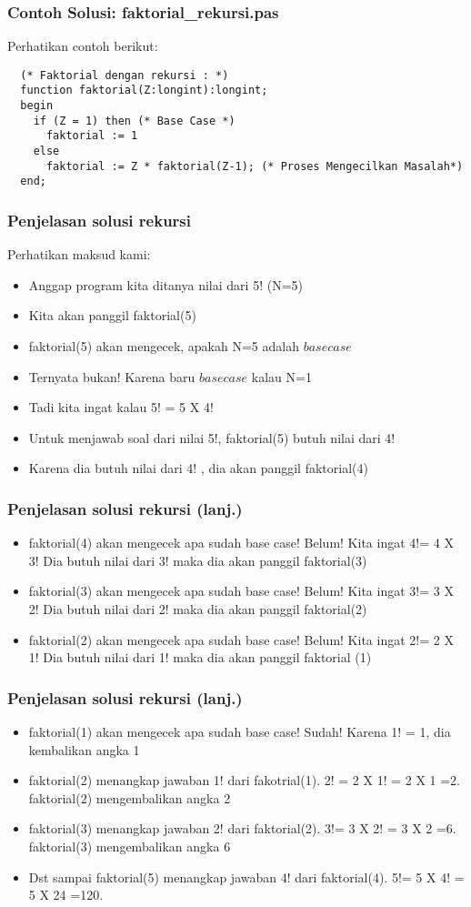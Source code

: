 \begin{frame}[fragile]
\frametitle{Contoh Solusi: faktorial\_rekursi.pas}
Perhatikan contoh berikut:
\begin{lstlisting}
  (* Faktorial dengan rekursi : *)
  function faktorial(Z:longint):longint;
  begin
    if (Z = 1) then (* Base Case *)
      faktorial := 1
    else
      faktorial := Z * faktorial(Z-1); (* Proses Mengecilkan Masalah*)
  end;
\end{lstlisting}
\end{frame}

\begin{frame}
\frametitle{Penjelasan solusi rekursi}
Perhatikan maksud kami:
\begin {itemize}
  \item Anggap program kita ditanya nilai dari 5! (N=5)
  \item Kita akan panggil faktorial(5)
  \item faktorial(5) akan mengecek, apakah N=5 adalah $base case$
  \item Ternyata bukan! Karena baru $base case$ kalau N=1
  \item Tadi kita ingat kalau 5! = 5 X 4!
  \item Untuk menjawab soal dari nilai 5!, faktorial(5)  butuh nilai dari 4!
  \item Karena dia butuh nilai dari 4! , dia akan panggil faktorial(4)
\end{itemize}
\end{frame}

\begin{frame}
\frametitle{Penjelasan solusi rekursi (lanj.) }
\begin {itemize}
  \item faktorial(4) akan mengecek apa sudah base case! Belum! Kita ingat 4!= 4 X 3! Dia butuh nilai dari 3! maka dia akan panggil faktorial(3)
  \item faktorial(3) akan mengecek apa sudah base case! Belum! Kita ingat 3!= 3 X 2! Dia butuh nilai dari 2! maka dia akan panggil faktorial(2)
  \item faktorial(2) akan mengecek apa sudah base case! Belum! Kita ingat 2!= 2 X 1! Dia butuh nilai dari 1! maka dia akan panggil faktorial (1)
\end{itemize}
\end{frame}

\begin{frame}
\frametitle{Penjelasan solusi rekursi (lanj.) }
\begin {itemize}
  \item faktorial(1) akan mengecek apa sudah base case! Sudah! Karena 1! = 1, dia kembalikan angka 1
  \item faktorial(2) menangkap jawaban 1! dari fakotrial(1). 2! = 2 X 1! = 2 X 1 =2. faktorial(2) mengembalikan angka 2
  \item faktorial(3) menangkap jawaban 2! dari faktorial(2). 3!= 3 X 2! = 3 X 2 =6. faktorial(3) mengembalikan angka 6
  \item Dst sampai faktorial(5) menangkap jawaban 4! dari faktorial(4). 5!= 5 X 4! = 5 X 24 =120.
\end{itemize}
\end{frame}


